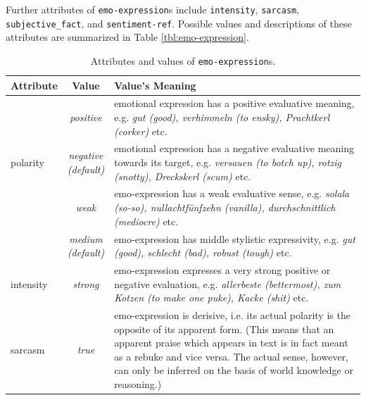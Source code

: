 Further attributes of \texttt{emo-expression}s include
\texttt{intensity}, \texttt{sarcasm}, \texttt{subjective\_fact}, and
\texttt{sentiment-ref}.  Possible values and descriptions of these
attributes are summarized in Table \ref{tbl:emo-expression}.
\begin{center}
  \begin{table}[ht]
    \caption{Attributes and values of \texttt{emo-expression}s.}
    \begin{tabular}{|l|c|p{0.935\clmnwidth}|}\hline
      Attribute & Value & Value's Meaning\\\hline

      & \textit{positive} & emotional expression has a positive
      evaluative meaning, e.g. \textit{gut (good), verhimmeln (to
        ensky), Prachtkerl (corker)} etc.\\\cline{2-3}

      \multirow{-2}{*}{polarity} & \textit{negative\newline(default)}
      & emotional expression has a negative evaluative meaning towards
      its target, e.g. \textit{versauen (to botch up), rotzig
        (snotty), Dreckskerl (scum)} etc.\\\hline


      & \textit{weak} & emo-expression has a weak evaluative sense,
      e.g. \textit{solala (so-so), nullachtf\"unfzehn (vanilla),
        durchschnittlich (mediocre)} etc.\\\cline{2-3}

      & \textit{medium\newline(default)} & emo-expression has middle
      stylistic expressivity, e.g. \textit{gut (good), schlecht (bad),
        robust (tough)} etc.\\\cline{2-3}

      \multirow{-3}{*}{intensity} & \textit{strong} & emo-expression
      expresses a very strong positive or negative evaluation,
      e.g. \textit{allerbeste (bettermost), zum Kotzen (to make one
        puke), Kacke (shit)} etc.\\\hline


      \multirow{2}{*}{sarcasm} & \textit{true} & emo-expression is
      derisive, i.e. its actual polarity is the opposite of its
      apparent form. (This means that an apparent praise which appears
      in text is in fact meant as a rebuke and vice versa. The actual
      sense, however, can only be inferred on the basis of world
      knowledge or reasoning.)\\\cline{2-3}


\end{tabular}
\end{table}
\end{center}
